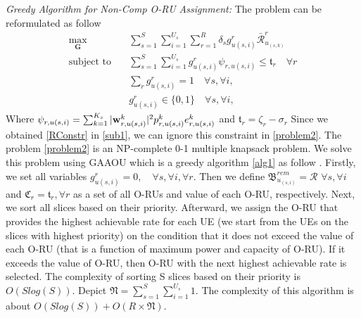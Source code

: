 \documentclass[conference]{IEEEtran}
\begin{document}
\textit{Greedy Algorithm for Non-Comp O-RU Assignment:}
The problem can be reformulated as follow
\begin{subequations}\label{problem2}
\begin{alignat}{4}
\max\limits_{ \boldsymbol{G} }   \quad &  \sum_{s=1}^S\sum_{i=1}^{U_s}\sum_{r=1}^{R} \delta_s g^r_{u(s,i)}\bar{\mathcal{R}}^r_{u_{(s,k)}} \ \\
\text{subject to} \quad  & \sum_{s=1}^{S}\sum_{i=1}^{U_s} g_{u(s,i)}^r \psi_{r,u(s,i)}\leq \mathfrak{t}_r \quad \forall r
 \label{p11} \\
& \sum_{r}g^r_{u(s,i)} = 1  \quad \forall s,\forall i, \label{p12}\\
 & g^r_{u(s,i)} \in \{0,1\} \quad \forall s,\forall i, \label{p13}  
\end{alignat}
\end{subequations}
Where $ \psi_{r,u(s,i)}=\sum_{k=1}^{K_s}|\bold{w}_{r,u(s,i)}^{k}|^2 p_{r,u(s,i)}^{k}  e^k_{r,u(s,i)}$
and $\mathfrak{t}_r = \zeta_r- \sigma_r$
Since we obtained \eqref{RConstr} in \eqref{sub1}, we can ignore this constraint in \eqref{problem2}.
The problem \eqref{problem2} is an NP-complete 0-1 multiple knapsack problem.  
We solve this problem using GAAOU which is a greedy algorithm \eqref{alg1} as follow \cite{akccay2007greedy,lee2018dynamic}.
Firstly, we set all variables $g^r_{u(s,i)} = 0, \quad \forall s, \forall i, \forall r$. 
Then we define ${\mathfrak{B}}^{rem}_{u_{(s,i)}} = \mathcal{R}$  $\forall s, \forall i$ and $ \mathfrak{C}_r = \mathfrak{t}_r, \forall r$
as a set of all O-RUs and value of each O-RU, respectively.
Next, we sort all slices based on their priority. 
Afterward, we assign the O-RU that provides the highest achievable rate for each UE (we start from the UEs on the slices with highest priority) on the condition that 
it does not exceed the value of each O-RU (that is a function of maximum power and capacity of O-RU).
If it exceeds the value of O-RU, then O-RU with the next highest achievable rate is selected. 
The complexity of sorting S slices based on their priority is $O(Slog(S))$.
Depict $\mathfrak{N} =  \sum_{s=1}^S\sum_{i=1}^{U_s} 1$. 
The complexity of this algorithm is about $O(Slog(S)) + O(R\times \mathfrak{N})$.
\end{document}

